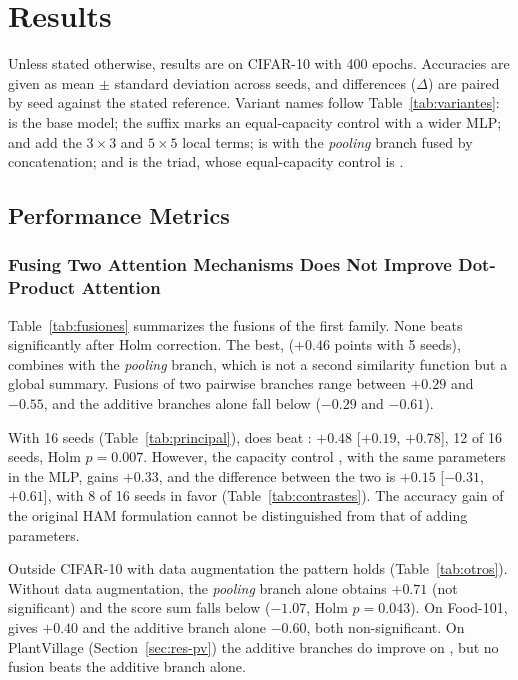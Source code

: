 \section{Results}
\label{sec:resultados}

Unless stated otherwise, results are on CIFAR-10 with 400 epochs. Accuracies are given as mean $\pm$ standard deviation across seeds, and differences ($\Delta$) are paired by seed against the stated reference. Variant names follow Table~\ref{tab:variantes}:  is the base model; the suffix  marks an equal-capacity control with a wider MLP;  and  add the $3\times3$ and $5\times5$ local terms;  is  with the \emph{pooling} branch fused by concatenation; and  is the triad, whose equal-capacity control is .

\subsection{Performance Metrics}
\label{sec:desempeno}

\subsubsection{Fusing Two Attention Mechanisms Does Not Improve Dot-Product Attention}
\label{sec:res-fusiones}
Table~\ref{tab:fusiones} summarizes the fusions of the first family. None beats  significantly after Holm correction. The best,  ($+0.46$ points with 5 seeds), combines  with the \emph{pooling} branch, which is not a second similarity function but a global summary. Fusions of two pairwise branches range between $+0.29$ and $-0.55$, and the additive branches alone fall below  ($-0.29$ and $-0.61$).



With 16 seeds (Table~\ref{tab:principal}),  does beat : $+0.48$ [$+0.19$, $+0.78$], 12 of 16 seeds, Holm $p=0.007$. However, the capacity control , with the same parameters in the MLP, gains $+0.33$, and the difference between the two is $+0.15$ [$-0.31$, $+0.61$], with 8 of 16 seeds in favor (Table~\ref{tab:contrastes}). The accuracy gain of the original HAM formulation cannot be distinguished from that of adding parameters.

Outside CIFAR-10 with data augmentation the pattern holds (Table~\ref{tab:otros}). Without data augmentation, the \emph{pooling} branch alone obtains $+0.71$ (not significant) and the score sum falls below  ($-1.07$, Holm $p=0.043$). On Food-101,  gives $+0.40$ and the additive branch alone $-0.60$, both non-significant. On PlantVillage (Section~\ref{sec:res-pv}) the additive branches do improve on , but no fusion beats the additive branch alone.

